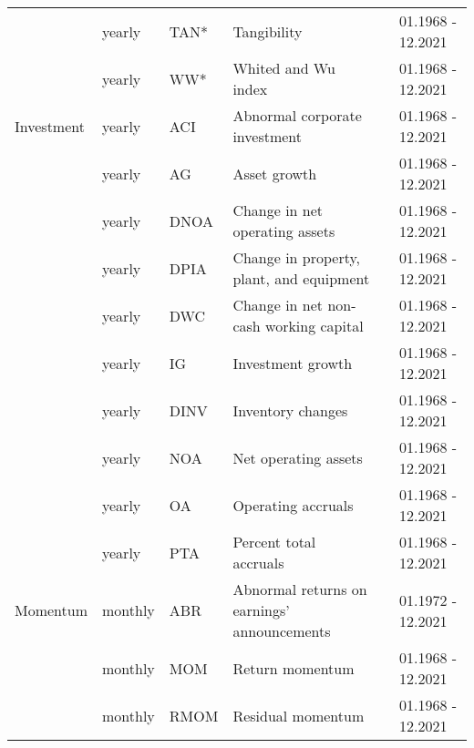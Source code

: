 \begin{landscape}
{\begin{ThreePartTable}
\begin{center}
\begin{footnotesize}
\begin{longtabu}{p{2.4cm} p{2cm} p{1.6cm} p{8.5cm} p{5.7cm} p{3.2cm}}
                        \rule{0pt}{1ex}
						  & yearly & TAN* & Tangibility & \cite{ha/le/2009} & 01.1968 - 12.2021 \\
                        \rule{0pt}{1ex}
					    & yearly & WW* & Whited and Wu index & \cite{wh/wu/2006} & 01.1968 - 12.2021 \\
                        \hline 
                        \pagebreak
                        \rule{0pt}{2ex}
						  Investment & yearly & ACI & Abnormal corporate investment & \cite{ti/we/xi/2004} & 01.1968 - 12.2021 \\
						  \rule{0pt}{1ex}
						  & yearly & AG & Asset growth & \cite{co/gu/sc/2008} & 01.1968 - 12.2021  \\
                        \rule{0pt}{1ex}
						& yearly & DNOA & Change in net operating assets & \cite{hi/ho/te/zh/2004} & 01.1968 - 12.2021 \\
                        \rule{0pt}{1ex}
						& yearly & DPIA & Change in property, plant, and equipment & \cite{ly/su/zh/2008} & 01.1968 - 12.2021 \\
						\rule{0pt}{1ex}
						& yearly & DWC & Change in net non-cash working capital & \cite{ri/sl/so/tu/2005} & 01.1968 - 12.2021  \\
						\rule{0pt}{1ex}
						& yearly & IG & Investment growth & \cite{xi/2008} & 01.1968 - 12.2021 \\
						  \rule{0pt}{1ex}
						  & yearly & DINV & Inventory changes & \cite{th/zh/2002} & 01.1968 - 12.2021  \\
						  \rule{0pt}{1ex}
						  & yearly & NOA & Net operating assets & \cite{hi/ho/te/zh/2004} & 01.1968 - 12.2021  \\
                        \rule{0pt}{1ex}
                        & yearly & OA & Operating accruals & \cite{sl/1996} & 01.1968 - 12.2021 \\
                        \rule{0pt}{1ex}
						  & yearly & PTA & Percent total accruals & \cite{ha/lu/va/2011} & 01.1968 - 12.2021 \\
      					\hline
                        \rule{0pt}{2ex}
						Momentum& monthly & ABR & Abnormal returns on earnings' announcements & \cite{ch/je/la/1996} & 01.1972 - 12.2021  \\
						\rule{0pt}{1ex}
						  & monthly & MOM & Return momentum  & \cite{fa/fr/1996} & 01.1968 - 12.2021 \\
                        \rule{0pt}{2ex}
						  & monthly & RMOM & Residual momentum  & \cite{bl/hu/ma/2011} & 01.1968 - 12.2021  \\

\end{longtabu}
\end{footnotesize}
\end{center}
\end{ThreePartTable}}
\end{landscape}
